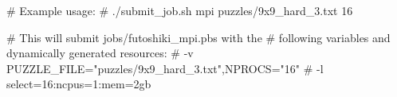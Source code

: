 # Example usage:
# ./submit_job.sh mpi puzzles/9x9_hard_3.txt 16

# This will submit jobs/futoshiki_mpi.pbs with the
# following variables and dynamically generated resources:
# -v PUZZLE_FILE="puzzles/9x9_hard_3.txt",NPROCS="16"
# -l select=16:ncpus=1:mem=2gb